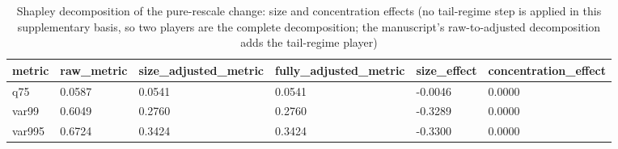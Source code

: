 \begin{table}[htbp]
\centering
\caption{Shapley decomposition of the pure-rescale change: size and concentration effects (no tail-regime step is applied in this supplementary basis, so two players are the complete decomposition; the manuscript's raw-to-adjusted decomposition adds the tail-regime player)}
\label{tab:v1_decomp}
\begin{tabular}{llllll}
\toprule
\textbf{metric} & \textbf{raw_metric} & \textbf{size_adjusted_metric} & \textbf{fully_adjusted_metric} & \textbf{size_effect} & \textbf{concentration_effect} \\
\midrule
q75 & 0.0587 & 0.0541 & 0.0541 & -0.0046 & 0.0000 \\
var99 & 0.6049 & 0.2760 & 0.2760 & -0.3289 & 0.0000 \\
var995 & 0.6724 & 0.3424 & 0.3424 & -0.3300 & 0.0000 \\
\bottomrule
\end{tabular}
\end{table}
